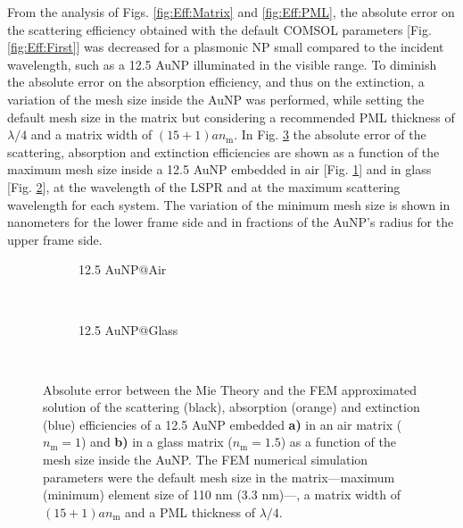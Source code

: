 From the analysis of Figs. \ref{fig:Eff:Matrix} and \ref{fig:Eff:PML}, the absolute error on the scattering efficiency obtained with the default COMSOL parameters [Fig. \ref{fig:Eff:First}] was decreased for a plasmonic NP small compared to the incident wavelength, such as a 12.5 AuNP illuminated in the visible range. To diminish the absolute error on the absorption efficiency, and thus on the extinction, a variation of the mesh size inside the AuNP was performed, while setting the default mesh size in the matrix but considering a recommended PML thickness of $\lambda/4$ and a matrix width of $(15+1)an_\text{m}$. In Fig. \ref{fig:Eff:rad} the absolute error of the scattering, absorption and extinction efficiencies are shown as a function  of the maximum mesh size inside a 12.5 AuNP embedded in air [Fig. \ref{fig:Eff:rad:a}] and in glass [Fig. \ref{fig:Eff:rad:b}], at the wavelength of the LSPR and at the maximum scattering wavelength for each system. The variation of the minimum mesh size is shown in nanometers for the lower frame side and  in fractions of the AuNP's radius for the upper frame side.

\begin{figure}[h!]
	\centering
	\def\svgwidth{.9\textwidth}
	\small
	\vspace*{1em}
	\hspace*{-.47\textwidth}
	 \begin{subfigure}{\textwidth}\caption{12.5 AuNP$@$Air}\label{fig:Eff:rad:a}\end{subfigure}\\[5.5em]
	\hspace*{-.45\textwidth}
	 \begin{subfigure}{\textwidth}\caption{12.5 AuNP$@$Glass}\label{fig:Eff:rad:b}\end{subfigure}\\[-10.1em]
\caption[Scattering, Absorption and Extinction Efficiencies absolute error: meshing size inside AuNP analysis ]{Absolute error between the Mie Theory and the FEM approximated solution of the scattering (black), absorption (orange) and extinction (blue) efficiencies of a 12.5 AuNP embedded \textbf{a)} in an air matrix ($n_\text{m} = 1$) and \textbf{b)} in a glass matrix ($n_\text{m} = 1.5$) as a function of the mesh size inside the AuNP. The FEM numerical simulation parameters were the default mesh size  in the matrix---maximum (minimum) element size of 110 nm (3.3 nm)---, a matrix width of $(15+1) a n_\text{m}$ and a PML thickness of $\lambda/4$.}
\label{fig:Eff:rad}
\end{figure}

